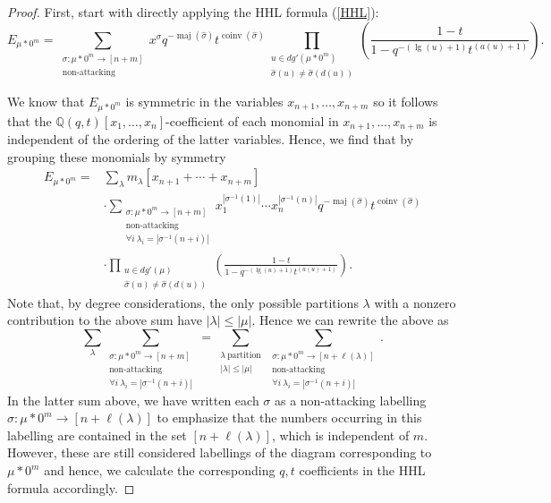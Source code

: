 \documentclass[ALCO,Unicode]{cedram}
\DeclareMathOperator{\maj}{maj}
\DeclareMathOperator{\coinv}{coinv}
\DeclareMathOperator{\mathleg}{lg}
\begin{document}
 \begin{proof}
 First, start with directly applying the HHL formula (\ref{HHL}):
  $$ E_{\mu * 0^m} = \sum_{\substack{\sigma: \mu * 0^m \rightarrow [n + m]\\ \text{non-attacking}}} x^{\sigma}q^{-\maj(\widehat{\sigma})}t^{\coinv(\widehat{\sigma})} \prod_{\substack{u \in dg'(\mu * 0^m) \\ \widehat{\sigma}(u) \neq \widehat{\sigma}(d(u))}} \left( \frac{1-t}{1-q^{-(\mathleg(u)+1)}t^{(a(u)+1)}} \right) .$$
  
  We know that $E_{\mu * 0^m}$ is symmetric in the variables $x_{n+1},\ldots,x_{n+m}$ \cite{C_2003} so it follows that the $\mathbb{Q}(q,t)[x_1,\ldots,x_n]$-coefficient of each monomial in $x_{n+1},\ldots,x_{n+m}$ is independent of the ordering of the latter variables. Hence, we find that by grouping these monomials by symmetry 
\begin{align*}
    E_{\mu * 0^m} = {} & {} \sum_{\lambda} m_{\lambda}[x_{n+1}+\cdots+x_{n+m}]  \\ 
    & \cdot \sum_{\substack{\sigma: \mu * 0^m \rightarrow [n + m] \\ \text{non-attacking} \\ \forall i ~ \lambda_i = |\sigma^{-1}(n+i)|  }} x_1 ^{|\sigma^{-1}(1)|}\cdots x_n ^{|\sigma^{-1}(n)|} q^{-\maj(\widehat{\sigma})}t^{\coinv(\widehat{\sigma})} \\
    & \cdot \prod_{\substack{u \in dg'(\mu) \\ \widehat{\sigma}(u) \neq \widehat{\sigma}(d(u))}} \left( \frac{1-t}{1-q^{-(\mathleg(u)+1)}t^{(a(u)+1)}} \right).
\end{align*}
 Note that, by degree considerations, the only possible partitions $\lambda$ with a nonzero contribution to the above sum have $|\lambda| \leq |\mu|$. Hence we can rewrite the above as 
  $$ \sum_{\lambda} \sum_{\substack{\sigma: \mu * 0^m \rightarrow [n + m] \\ \text{non-attacking} \\ \forall i ~ \lambda_i = |\sigma^{-1}(n+i)|  }} = \sum_{\substack{\lambda ~ \text{partition}  \\ |\lambda| \leq |\mu|}} \sum_{\substack{\sigma:\mu* 0^m \rightarrow [n+\ell(\lambda)]\\ \text{non-attacking} \\ \forall i ~ \lambda_i = |\sigma^{-1}(n+i)|}}    .$$
In the latter sum above, we have written each $\sigma$ as a non-attacking labelling $\sigma: \mu*0^m \rightarrow [n+\ell(\lambda)]$ to emphasize that the numbers occurring in this labelling are contained in the set $[n+\ell(\lambda)]$, which is independent of $m$. However, these are still considered labellings of the diagram corresponding to $\mu*0^m$ and hence, we calculate the corresponding $q,t$ coefficients in the HHL formula accordingly.
  

\end{proof}
\end{document}
